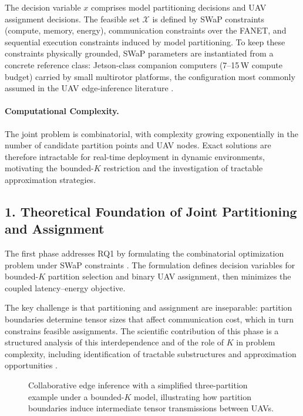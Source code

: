 The decision variable $x$ comprises model partitioning decisions and UAV assignment decisions. The feasible set $\mathcal{X}$ is defined by SWaP constraints (compute, memory, energy), communication constraints over the FANET, and sequential execution constraints induced by model partitioning. To keep these constraints physically grounded, SWaP parameters are instantiated from a concrete reference class: Jetson-class companion computers (7--15\,W compute budget) carried by small multirotor platforms, the configuration most commonly assumed in the UAV edge-inference literature \cite{mcenroe2022survey,qu2024elastic}.

\paragraph{Computational Complexity.}
The joint problem is combinatorial, with complexity growing exponentially in the number of candidate partition points and UAV nodes. Exact solutions are therefore intractable for real-time deployment in dynamic environments, motivating the bounded-$K$ restriction and the investigation of tractable approximation strategies.

\subsection*{1. Theoretical Foundation of Joint Partitioning and Assignment}
The first phase addresses RQ1 by formulating the combinatorial optimization problem under SWaP constraints \cite{qu2024elastic,hu2025splitreview,duan2022combined,li2024fsl,kang2017neurosurgeon,hu2019dads,zhao2025joint}. The formulation defines decision variables for bounded-$K$ partition selection and binary UAV assignment, then minimizes the coupled latency--energy objective.

The key challenge is that partitioning and assignment are inseparable: partition boundaries determine tensor sizes that affect communication cost, which in turn constrains feasible assignments. The scientific contribution of this phase is a structured analysis of this interdependence and of the role of $K$ in problem complexity, including identification of tractable substructures and approximation opportunities \cite{hu2025splitreview,mcenroe2022survey}.

\begin{figure}[H]
  \centering
  \resizebox{0.85\textwidth}{!}{}
  \caption{Collaborative edge inference with a simplified three-partition example under a bounded-$K$ model, illustrating how partition boundaries induce intermediate tensor transmissions between UAVs.}
  \label{fig:architecture}
\end{figure}

